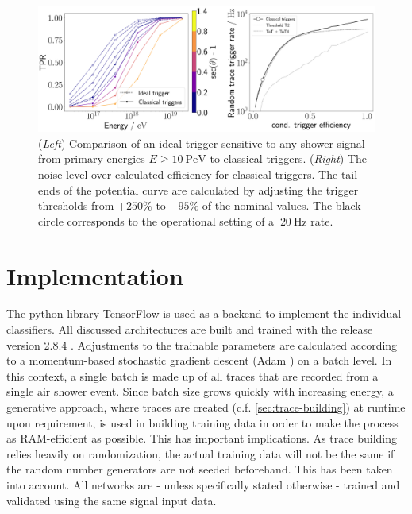 \begin{figure}
	\centering
	\includegraphics[width=1\textwidth]{./plots/classical_triggers.png}
	\caption{(\textit{Left}) Comparison of an ideal trigger sensitive to any shower signal from primary energies $E\geq\SI{10}{\peta\electronvolt}$ to classical 
    triggers. (\textit{Right}) The noise level over calculated efficiency for classical triggers. The tail ends of the potential curve are calculated by adjusting the
    trigger thresholds from $+250\%$ to $-95\%$ of the nominal values. The black circle corresponds to the operational setting of a $~\SI{20}{\hertz}$ rate.}
	\label{fig:classical-trigger-performance}
\end{figure}

\section{Implementation}
\label{sec:implementation}

The python library TensorFlow \cite{tensorflow2015-whitepaper} is used as a backend to implement the individual classifiers. All discussed architectures are built 
and trained with the release version 2.8.4 \cite{tensorflowversion}. Adjustments to the trainable parameters are calculated according to a momentum-based 
stochastic gradient descent (Adam \cite{kingma2014adam}) on a batch level. In this context, a single batch is made up of all traces that are recorded from a single 
air shower event. Since batch size grows quickly with increasing energy, a generative approach, where traces are created (c.f. \autoref{sec:trace-building}) at 
runtime upon requirement, is used in building training data in order to make the process as RAM-efficient as possible. This has important implications. As trace 
building relies heavily on randomization, the actual training data will not be the same if the random number generators are not seeded beforehand. This has been
taken into account. All networks are - unless specifically stated otherwise - trained and validated using the same signal input data.

